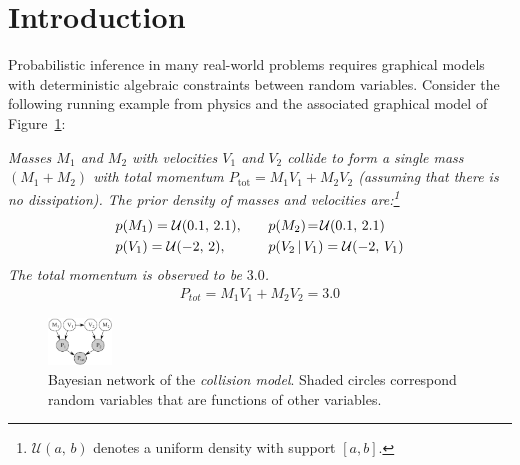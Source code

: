 \section{Introduction}
\label{sect:intro}

\noindent
Probabilistic inference in many real-world problems requires graphical
models with deterministic algebraic constraints between random
variables.
Consider the following running example from physics and the
associated graphical model of Figure~\ref{fig:collision.bn}:

\emph{
Masses $M_1$ and $M_2$ with velocities $V_1$ and $V_2$ collide to form a single mass $(M_1 + M_2)$ with total momentum 
$P_\text{tot} = M_1 V_1 + M_2 V_2$ (assuming that there is no dissipation).
The prior density of masses and velocities are:\footnote{
$\mathcal{U}(a, \, b)$ denotes a uniform density with support $[a,b]$.}
\begin{align}
&p(M_1) = \mathcal{U}(0.1, \, 2.1), \quad 
&&p(M_2) \!=\! \mathcal{U}(0.1, \, 2.1) \label{sym:u12}\\
&p(V_1) = \mathcal{U}(-2, \, 2), \quad
&&p(V_2 \, | \, V_1) = \mathcal{U}(-2, \, V_1) \label{sym:u34}
\end{align}
The total momentum is observed to be $3.0$.
\begin{align}\label{f:p_tot}
P_{tot} = M_1 V_1 + M_2 V_2 = 3.0
\end{align}
}%

\begin{figure}
\center
\includegraphics[width=0.15\textwidth]{Figs/little-momentum1.pdf} 
\vspace{-2mm}
\caption{\footnotesize Bayesian network of the \emph{collision model}. Shaded circles correspond random variables that are functions of other variables.}
\label{fig:collision.bn}
\vspace{-5mm}
\end{figure}



 

